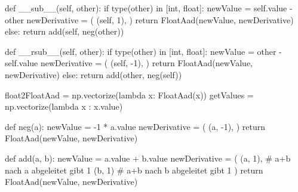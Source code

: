 \documentclass[
  a4paper,
  DIV=11]{scrreprt}
\newenvironment{Shaded}{\begin{snugshade}}{\end{snugshade}}
\newcommand{\BuiltInTok}[1]{\textcolor[rgb]{0.00,0.23,0.31}{#1}}
\newcommand{\CommentTok}[1]{\textcolor[rgb]{0.37,0.37,0.37}{#1}}
\newcommand{\ControlFlowTok}[1]{\textcolor[rgb]{0.00,0.23,0.31}{#1}}
\newcommand{\DecValTok}[1]{\textcolor[rgb]{0.68,0.00,0.00}{#1}}
\newcommand{\FunctionTok}[1]{\textcolor[rgb]{0.28,0.35,0.67}{#1}}
\newcommand{\KeywordTok}[1]{\textcolor[rgb]{0.00,0.23,0.31}{#1}}
\newcommand{\NormalTok}[1]{\textcolor[rgb]{0.00,0.23,0.31}{#1}}
\newcommand{\OperatorTok}[1]{\textcolor[rgb]{0.37,0.37,0.37}{#1}}
\newcommand{\VariableTok}[1]{\textcolor[rgb]{0.07,0.07,0.07}{#1}}
\theoremstyle{definition}
\theoremstyle{definition}
\theoremstyle{remark}
\begin{document}
\begin{Shaded}
\begin{Highlighting}[]
    \KeywordTok{def} \FunctionTok{\_\_sub\_\_}\NormalTok{(}\VariableTok{self}\NormalTok{, other):}
        \ControlFlowTok{if} \BuiltInTok{type}\NormalTok{(other) }\KeywordTok{in}\NormalTok{ [}\BuiltInTok{int}\NormalTok{, }\BuiltInTok{float}\NormalTok{]:}
\NormalTok{            newValue }\OperatorTok{=} \VariableTok{self}\NormalTok{.value }\OperatorTok{{-}}\NormalTok{ other}
\NormalTok{            newDerivative }\OperatorTok{=}\NormalTok{ (}
\NormalTok{                (}\VariableTok{self}\NormalTok{, }\DecValTok{1}\NormalTok{),}
\NormalTok{            )}
            \ControlFlowTok{return}\NormalTok{ FloatAad(newValue, newDerivative)}
        \ControlFlowTok{else}\NormalTok{:}
            \ControlFlowTok{return}\NormalTok{ add(}\VariableTok{self}\NormalTok{, neg(other))}
        
    \KeywordTok{def} \FunctionTok{\_\_rsub\_\_}\NormalTok{(}\VariableTok{self}\NormalTok{, other):}
        \ControlFlowTok{if} \BuiltInTok{type}\NormalTok{(other) }\KeywordTok{in}\NormalTok{ [}\BuiltInTok{int}\NormalTok{, }\BuiltInTok{float}\NormalTok{]:}
\NormalTok{            newValue }\OperatorTok{=}\NormalTok{ other }\OperatorTok{{-}} \VariableTok{self}\NormalTok{.value}
\NormalTok{            newDerivative }\OperatorTok{=}\NormalTok{ (}
\NormalTok{                (}\VariableTok{self}\NormalTok{, }\OperatorTok{{-}}\DecValTok{1}\NormalTok{),}
\NormalTok{            )}
            \ControlFlowTok{return}\NormalTok{ FloatAad(newValue, newDerivative)}
        \ControlFlowTok{else}\NormalTok{:}
            \ControlFlowTok{return}\NormalTok{ add(other, neg(}\VariableTok{self}\NormalTok{)) }

\NormalTok{float2FloatAad }\OperatorTok{=}\NormalTok{ np.vectorize(}\KeywordTok{lambda}\NormalTok{ x: FloatAad(x))}
\NormalTok{getValues }\OperatorTok{=}\NormalTok{ np.vectorize(}\KeywordTok{lambda}\NormalTok{ x : x.value)}

\KeywordTok{def}\NormalTok{ neg(a):}
\NormalTok{    newValue }\OperatorTok{=} \OperatorTok{{-}}\DecValTok{1} \OperatorTok{*}\NormalTok{ a.value}
\NormalTok{    newDerivative }\OperatorTok{=}\NormalTok{ (}
\NormalTok{        (a, }\OperatorTok{{-}}\DecValTok{1}\NormalTok{),}
\NormalTok{    )}
    \ControlFlowTok{return}\NormalTok{ FloatAad(newValue, newDerivative)}

\KeywordTok{def}\NormalTok{ add(a, b):}
\NormalTok{    newValue }\OperatorTok{=}\NormalTok{ a.value }\OperatorTok{+}\NormalTok{ b.value}
\NormalTok{    newDerivative }\OperatorTok{=}\NormalTok{ (}
\NormalTok{        (a, }\DecValTok{1}\NormalTok{),  }\CommentTok{\# a+b nach a abgeleitet gibt 1}
\NormalTok{        (b, }\DecValTok{1}\NormalTok{)   }\CommentTok{\# a+b nach b abgeleitet gibt 1}
\NormalTok{    )}
    \ControlFlowTok{return}\NormalTok{ FloatAad(newValue, newDerivative)}


\end{Highlighting}
\end{Shaded}
\end{document}
